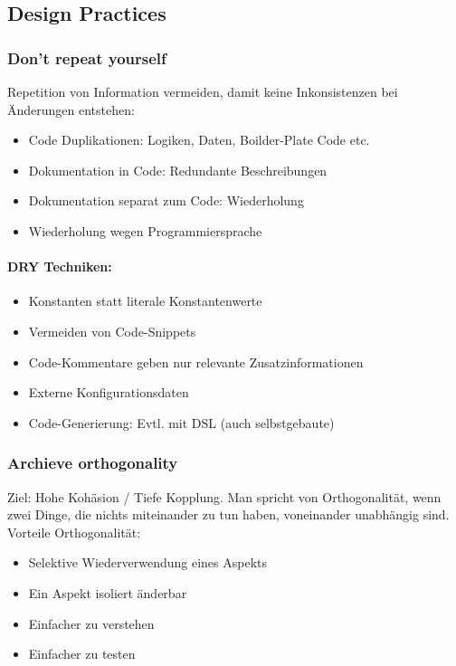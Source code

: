 \subsection{Design Practices}

\subsubsection{Don't repeat yourself}

Repetition von Information vermeiden, damit keine Inkonsistenzen bei Änderungen entstehen:

\begin{itemize}
	\item Code Duplikationen: Logiken, Daten, Boilder-Plate Code etc.
	\item Dokumentation in Code: Redundante Beschreibungen
	\item Dokumentation separat zum Code: Wiederholung
	\item Wiederholung wegen Programmiersprache
\end{itemize}


\paragraph{DRY Techniken:}
\begin{itemize}
	\item Konstanten statt literale Konstantenwerte
	\item Vermeiden von Code-Snippets
	\item Code-Kommentare geben nur relevante Zusatzinformationen
	\item Externe Konfigurationsdaten
	\item Code-Generierung: Evtl. mit DSL (auch selbstgebaute)
\end{itemize}

\subsubsection{Archieve orthogonality}

Ziel: Hohe Kohäsion / Tiefe Kopplung. Man spricht von Orthogonalität, wenn zwei Dinge, die nichts miteinander zu tun haben, voneinander unabhängig sind. Vorteile Orthogonalität:
\begin{itemize}
	\item Selektive Wiederverwendung eines Aspekts
	\item Ein Aspekt isoliert änderbar
	\item Einfacher zu verstehen
	\item Einfacher zu testen
\end{itemize}


